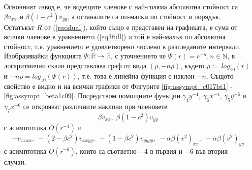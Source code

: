 \documentclass[a4paper]{article}
\newcommand{\rf}[1]{(\ref{#1})}
\newcommand{\RR}{\mathbb{R}}
\theoremstyle{remark}
\begin{document}
Основният извод е, че водещите членове с най-голяма абсолютна стойност са $\beta v_{xx}$ и $\beta (1-c^2) v_{yy}$, а останалите са по-малки по стойност и порядък. Остатъкът $R$ от \rf{residual}, който също е представен на графиката, е сума от всички членове в уравнението \rf{eq3full} и той е най-малък по абсолютна стойност, т.е. уравнението е удовлетворено числено в разгледаните интервали. 
Изобразявайки функцията $\Psi : \RR \rightarrow \RR$, с уточнението че $\Psi(r) = r^{-n}, n \in \mathbb{N}$, в логаритмични скали представлява граф от вида $(\rho, -n \rho )$, където $\rho := log_{10}(r)$ и $ -n \rho = log_{10}( \Psi(r) ) $, т.е. това е линейна функция с наклон $-n$. Същото свойство е видно и на всички графики от Фигурите \ref{fig:assympt_c017bt1} - \ref{fig:assympt_beta1c09}. Посредством помощните функции $\gamma_4 y^{-4}$, $\gamma_6 x^{-4}$, $\gamma_5 y^{-6}$ и $\gamma_7 x^{-6}$ се открояват различните наклони при членовете 
$$
\beta v_{xx}, \; \beta (1-c^2) v_{yy}
$$ 
с асимптотика $O(r^{-4})$ и 
$$
- v_{xxxx}, \;  - (2-\beta c^2)v_{xxyy},  \;  - (1-\beta c^2)v_{yyyy}, \;  - \alpha \beta (v^2)_{xx}, \; - \alpha \beta (v^2)_{yy}
$$
с асимптотика $O(r^{-6})$, които са съответно $-4$ в първия и $-6$ във втория случаи.
\end{document}
